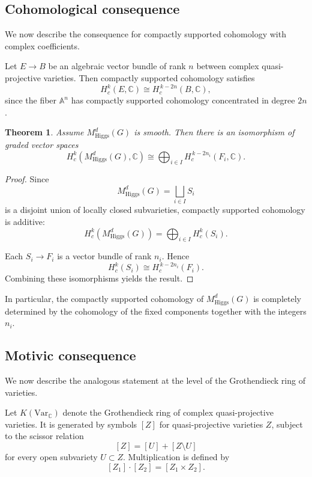 \documentclass[11pt, reqno]{amsart}
\numberwithin{equation}{section}
\newtheorem{theorem}{Theorem}[section]
\theoremstyle{definition}
\begin{document}
\subsection*{Cohomological consequence}

We now describe the consequence for compactly supported
cohomology with complex coefficients.

Let $E \to B$ be an algebraic vector bundle of rank $n$
between complex quasi-projective varieties.
Then compactly supported cohomology satisfies
\[
H_c^k(E,\mathbb{C})
\cong
H_c^{\,k-2n}(B,\mathbb{C}),
\]
since the fiber $\mathbb{A}^n$ has compactly supported
cohomology concentrated in degree $2n$.

\begin{theorem}
Assume $M^d_{\mathrm{Higgs}}(G)$ is smooth.
Then there is an isomorphism of graded vector spaces
\[
H_c^k\!\left(M^d_{\mathrm{Higgs}}(G),\mathbb{C}\right)
\cong
\bigoplus_{i\in I}
H_c^{\,k-2n_i}(F_i,\mathbb{C}).
\]
\end{theorem}

\begin{proof}
Since
\[
M^d_{\mathrm{Higgs}}(G)
=
\bigsqcup_{i\in I} S_i
\]
is a disjoint union of locally closed subvarieties,
compactly supported cohomology is additive:
\[
H_c^k\!\left(M^d_{\mathrm{Higgs}}(G)\right)
=
\bigoplus_{i\in I}
H_c^k(S_i).
\]

Each $S_i \to F_i$ is a vector bundle of rank $n_i$.
Hence
\[
H_c^k(S_i)
\cong
H_c^{\,k-2n_i}(F_i).
\]
Combining these isomorphisms yields the result.
\end{proof}

In particular, the compactly supported cohomology of
$M^d_{\mathrm{Higgs}}(G)$ is completely determined by
the cohomology of the fixed components together with
the integers $n_i$.

\subsection*{Motivic consequence}

We now describe the analogous statement at the level of
the Grothendieck ring of varieties.

Let $K(\mathrm{Var}_{\mathbb{C}})$ denote the Grothendieck
ring of complex quasi-projective varieties.
It is generated by symbols $[Z]$ for quasi-projective
varieties $Z$, subject to the scissor relation
\[
[Z] = [U] + [Z \setminus U]
\]
for every open subvariety $U\subset Z$.
Multiplication is defined by
\[
[Z_1]\cdot[Z_2] = [Z_1\times Z_2].
\]
\end{document}
